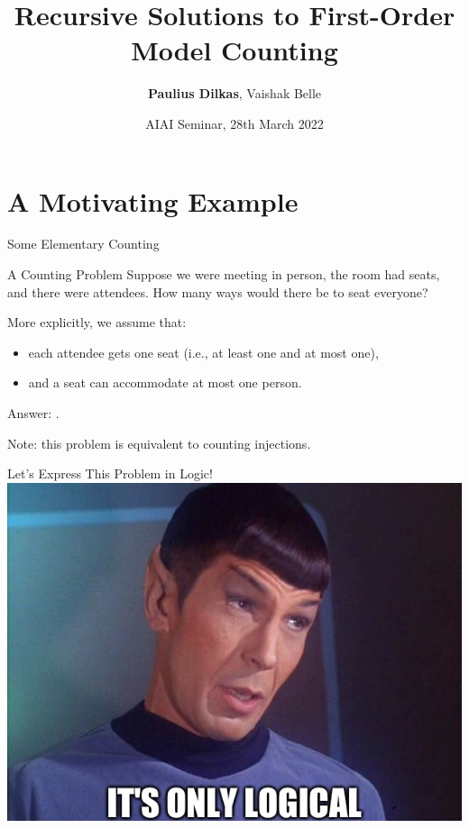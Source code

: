 \documentclass{beamer}
\author[Paulius Dilkas]{\textbf{Paulius Dilkas}, Vaishak Belle}
\title[Recursive Solutions to FOMC]{Recursive Solutions to First-Order Model Counting}
\date{AIAI Seminar, 28th March 2022}
\begin{document}

\maketitle

\section{A Motivating Example}

\begin{frame}{Some Elementary Counting}
  \begin{exampleblock}{A Counting Problem}
    Suppose we were meeting in person, the room had  seats, and there were  attendees. How many ways would there be to seat everyone?
  \end{exampleblock}

  \pause
  More explicitly, we assume that:
  \begin{itemize}
  \item each attendee gets one seat (i.e., at least one \alert{and} at most one),
  \item and a seat can accommodate at most one person.
  \end{itemize}

  \pause
  \alert{Answer:} .

  Note: this problem is equivalent to counting \structure{$[m] \to [n]$} injections.

\end{frame}

\begin{frame}{Let's Express This Problem in Logic!}
  \centering
  \includegraphics[height=0.8\textheight]{spock.jpg}
\end{frame}
\end{document}
